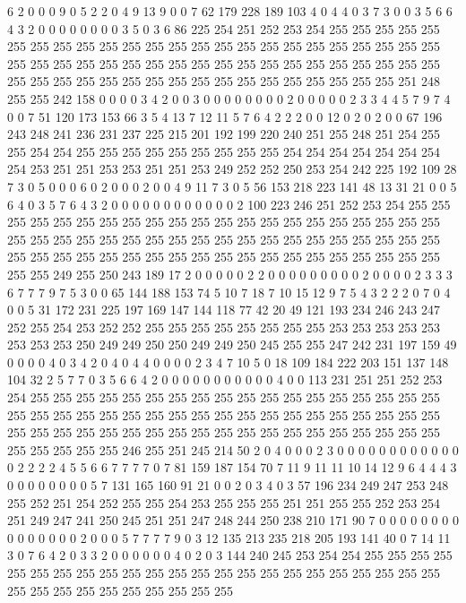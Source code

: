 6 2 0 0 0 9 0 5 2 2 0 4 9 13 9 0 0 7 62 179
228 189 103 4 0 4 4 0 3 7 3 0 0 3 5 6 6 4 3 2
0 0 0 0 0 0 0 0 3 5 0 3 6 86 225 254 251 252 253 254
255 255 255 255 255 255 255 255 255 255 255 255 255 255 255 255 255 255 255 255
255 255 255 255 255 255 255 255 255 255 255 255 255 255 255 255 255 255 255 255
255 255 255 255 255 255 255 255 255 255 255 255 255 255 255 255 255 255 255 255
251 248 255 255 242 158 0 0 0 0 3 4 2 0 0 3 0 0 0 0
0 0 0 0 2 0 0 0 0 0 2 3 3 4 4 5 7 9 7 4
0 0 7 51 120 173 153 66 3 5 4 13 7 12 11 5 7 6 4 2
2 2 0 0 12 0 2 0 2 0 0 67 196 243 248 241 236 231 237 225
215 201 192 199 220 240 251 255 248 251 254 255 255 254 254 255 255 255 255 255
255 255 255 255 254 254 254 254 254 254 254 254 253 251 251 253 253 251 251 253
249 252 252 250 253 254 242 225 192 109 28 7 3 0 5 0 0 0 6 0
2 0 0 0 2 0 0 4 9 11 7 3 0 5 56 153 218 223 141 48
13 31 21 0 0 5 6 4 0 3 5 7 6 4 3 2 0 0 0 0
0 0 0 0 0 0 0 0 2 100 223 246 251 252 253 254 255 255 255 255
255 255 255 255 255 255 255 255 255 255 255 255 255 255 255 255 255 255 255 255
255 255 255 255 255 255 255 255 255 255 255 255 255 255 255 255 255 255 255 255
255 255 255 255 255 255 255 255 255 255 255 255 255 255 255 255 255 249 255 250
243 189 17 2 0 0 0 0 0 2 2 0 0 0 0 0 0 0 0 0
2 0 0 0 0 2 3 3 3 6 7 7 7 9 7 5 3 0 0 65
144 188 153 74 5 10 7 18 7 10 15 12 9 7 5 4 3 2 2 2
0 7 0 4 0 0 5 31 172 231 225 197 169 147 144 118 77 42 20 49
121 193 234 246 243 247 252 255 254 253 252 252 255 255 255 255 255 255 255 255
253 253 253 253 253 253 253 253 250 249 249 250 250 249 249 250 245 255 255 247
242 231 197 159 49 0 0 0 0 4 0 3 4 2 0 4 0 4 4 0
0 0 0 2 3 4 7 10 5 0 18 109 184 222 203 151 137 148 104 32
2 5 7 7 0 3 5 6 6 4 2 0 0 0 0 0 0 0 0 0
0 0 4 0 0 113 231 251 251 252 253 254 255 255 255 255 255 255 255 255
255 255 255 255 255 255 255 255 255 255 255 255 255 255 255 255 255 255 255 255
255 255 255 255 255 255 255 255 255 255 255 255 255 255 255 255 255 255 255 255
255 255 255 255 255 255 255 255 255 255 255 255 255 246 255 251 245 214 50 2
0 4 0 0 0 2 3 0 0 0 0 0 0 0 0 0 0 0 0 0
2 2 2 2 4 5 5 6 6 7 7 7 7 0 7 81 159 187 154 70
7 11 9 11 11 10 14 12 9 6 4 4 4 3 0 0 0 0 0 0
0 0 5 7 131 165 160 91 21 0 0 2 0 3 4 0 3 57 196 234
249 247 253 248 255 252 251 254 252 255 255 254 253 255 255 255 251 251 255 255
252 253 254 251 249 247 241 250 245 251 251 247 248 244 250 238 210 171 90 7
0 0 0 0 0 0 0 0 0 0 0 0 0 0 0 2 0 0 0 5
7 7 7 7 9 0 3 12 135 213 235 218 205 193 141 40 0 7 14 11
3 0 7 6 4 2 0 3 3 2 0 0 0 0 0 0 4 0 2 0
3 144 240 245 253 254 254 255 255 255 255 255 255 255 255 255 255 255 255 255
255 255 255 255 255 255 255 255 255 255 255 255 255 255 255 255 255 255 255 255
